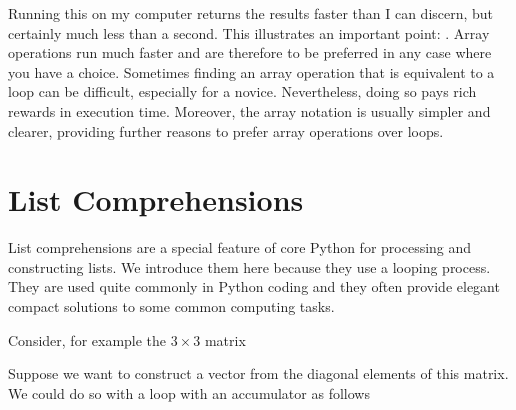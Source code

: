 \documentclass[letterpaper,10pt,english]{sphinxmanual}
\begin{document}
\sphinxAtStartPar
Running this on my computer returns the results faster than I can discern, but certainly much less than a second.  This illustrates an important point: .  Array operations run much faster and are therefore to be preferred in any case where you have a choice.  Sometimes finding an array operation that is equivalent to a loop can be difficult, especially for a novice.  Nevertheless, doing so pays rich rewards in execution time.  Moreover, the array notation is usually simpler and clearer, providing further reasons to prefer array operations over loops.

\ignorespaces 

\section{List Comprehensions}
\label{\detokenize{chap6/chap6_loopsconds:list-comprehensions}}\label{\detokenize{chap6/chap6_loopsconds:index-5}}
\sphinxAtStartPar
List comprehensions are a special feature of core Python for processing and constructing lists.  We introduce them here because they use a looping process.  They are used quite commonly in Python coding and they often provide elegant compact solutions to some common computing tasks.

\sphinxAtStartPar
Consider, for example the \(3 \times 3\) matrix

\begin{sphinxVerbatim}[commandchars=\\\{\}]
  \PYG{p}{[}\PYG{p}{[}  \PYG{p}{]} \PYG{p}{[}  \PYG{p}{]} \PYG{p}{[}  \PYG{p}{]}\PYG{p}{]}
\end{sphinxVerbatim}

\sphinxAtStartPar
Suppose we want to construct a vector from the diagonal elements of this matrix.  We could do so with a  loop with an accumulator as follows

\begin{sphinxVerbatim}[commandchars=\\\{\},numbers=left,firstnumber=1,stepnumber=1]
  \PYG{p}{[}\PYG{p}{]}
    \PYG{p}{[}  \PYG{p}{]}
     \PYG{p}{[}\PYG{p}{]}\PYG{p}{[}\PYG{p}{]}

\PYG{p}{[}  \PYG{p}{]}
\end{sphinxVerbatim}
\end{document}
